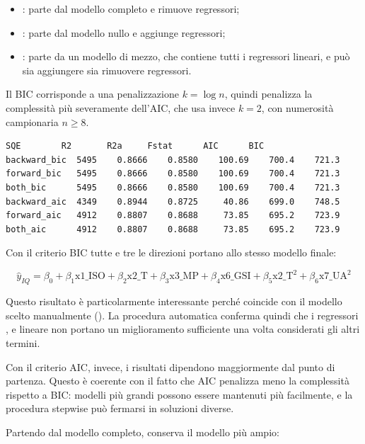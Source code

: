 \begin{itemize}
\item \texttt{}: parte dal modello completo e rimuove regressori;
\item \texttt{}: parte dal modello nullo e aggiunge regressori;
\item \texttt{}: parte da un modello di mezzo, che contiene tutti i regressori lineari, e può sia aggiungere sia rimuovere regressori.
\end{itemize}

Il BIC corrisponde a una penalizzazione $k = \log{n}$, quindi penalizza la complessità più severamente dell'AIC, che usa invece $k = 2$, con numerosità campionaria $n \ge 8$.

\begin{lstlisting}[style=rconsole]
              SQE        R2       R2a     Fstat      AIC      BIC
backward_bic  5495    0.8666    0.8580    100.69    700.4    721.3
forward_bic   5495    0.8666    0.8580    100.69    700.4    721.3
both_bic      5495    0.8666    0.8580    100.69    700.4    721.3
backward_aic  4349    0.8944    0.8725     40.86    699.0    748.5
forward_aic   4912    0.8807    0.8688     73.85    695.2    723.9
both_aic      4912    0.8807    0.8688     73.85    695.2    723.9
\end{lstlisting}

Con il criterio BIC tutte e tre le direzioni portano allo stesso modello finale:

\[
\widehat{y}_{IQ}
= \beta_0 + \beta_1 \text{x1\_ISO} + \beta_2 \text{x2\_T} + \beta_3 \text{x3\_MP}
+ \beta_4 \text{x6\_GSI}
+ \beta_5 \text{x2\_T}^2 + \beta_6 \text{x7\_UA}^2
\]

Questo risultato è particolarmente interessante perché coincide con il modello scelto manualmente (\texttt{}). La procedura automatica conferma quindi che i regressori \texttt{}, \texttt{} e \texttt{} lineare non portano un miglioramento sufficiente una volta considerati gli altri termini.

Con il criterio AIC, invece, i risultati dipendono maggiormente dal punto di partenza. Questo è coerente con il fatto che AIC penalizza meno la complessità rispetto a BIC: modelli più grandi possono essere mantenuti più facilmente, e la procedura stepwise può fermarsi in soluzioni diverse.

Partendo dal modello completo, \texttt{} conserva il modello più ampio:

